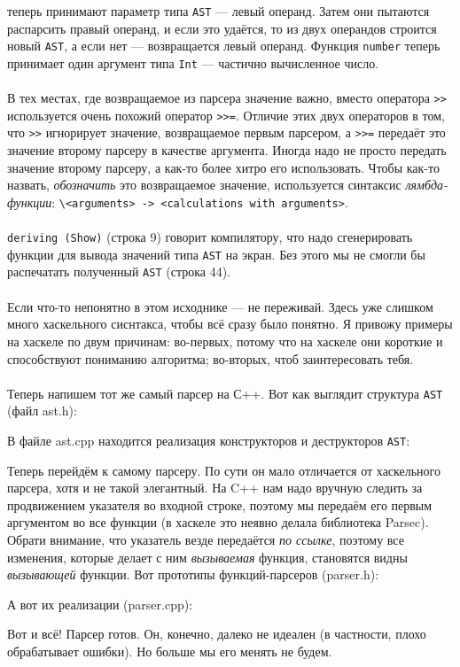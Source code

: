 \documentclass[11pt]{book}
\begin{document}
теперь принимают параметр типа \texttt{AST} --- левый операнд. Затем они пытаются распарсить правый операнд,
и если это удаётся, то из двух операндов строится новый \texttt{AST}, а если нет --- возвращается левый
операнд. Функция \texttt{number} теперь принимает один аргумент типа \texttt{Int} --- частично вычисленное число.
\\ \\
В тех местах, где возвращаемое из парсера значение важно, вместо оператора \texttt{>\thinspace >}
используется очень похожий оператор \texttt{>\thinspace >=}. Отличие этих двух операторов в том, что \texttt{>\thinspace >}
игнорирует значение, возвращаемое первым парсером, а \texttt{>\thinspace >=} передаёт это значение
второму парсеру в качестве аргумента. Иногда надо не просто передать значение второму парсеру,
а как-то более хитро его использовать.
Чтобы как-то назвать, \emph{обозначить} это возвращаемое значение, используется синтаксис \emph{лямбда-функции}:
\texttt{\textbackslash <arguments> -> <calculations with arguments>}.
\\ \\
\texttt{deriving (Show)} (строка 9) говорит компилятору, что надо сгенерировать функции для вывода
значений типа \texttt{AST} на экран. Без этого мы не смогли бы распечатать полученный \texttt{AST}
(строка 44).
\\ \\
Если что-то непонятно в этом исходнике --- не переживай. Здесь уже слишком много хаскельного сиснтакса,
чтобы всё сразу было понятно. Я привожу примеры на хаскеле по двум причинам: во-первых, потому что
на хаскеле они короткие и способствуют пониманию алгоритма; во-вторых, чтоб заинтересовать тебя.
\\ \\
Теперь напишем тот же самый парсер на С++. Вот как выглядит структура \texttt{AST} (файл ast.h):

В файле ast.cpp находится реализация конструкторов и деструкторов \texttt{AST}:

Теперь перейдём к самому парсеру. По сути он мало отличается от хаскельного
парсера, хотя и не такой элегантный. На C++ нам надо вручную следить
за продвижением указателя во входной строке, поэтому мы передаём его первым аргументом
во все функции (в хаскеле это неявно делала библиотека Parsec).
Обрати внимание, что указатель везде передаётся \emph{по ссылке}, поэтому все изменения, которые делает с ним \emph{вызываемая}
функция, становятся видны \emph{вызывающей} функции. Вот прототипы
функций-парсеров (parser.h):

А вот их реализации (parser.cpp):

Вот и всё! Парсер готов. Он, конечно, далеко не идеален (в частности, плохо обрабатывает ошибки).
Но больше мы его менять не будем.
\end{document}
